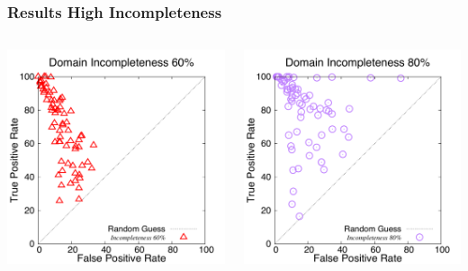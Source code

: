 \documentclass{beamer}
\begin{document}
\begin{frame}[c]\frametitle{Results High Incompleteness}
	\begin{columns}
		\begin{column}{0.45\textwidth}
			\centering
		\includegraphics[width=.9\linewidth]{roc_space_incomplete/rocspace-domain_incompleteness-60.pdf}
		\end{column}
		\begin{column}{0.45\textwidth}
			\centering
		\includegraphics[width=.9\linewidth]{roc_space_incomplete/rocspace-domain_incompleteness-80.pdf}
		\end{column}
	\end{columns}
\end{frame}
\end{document}

